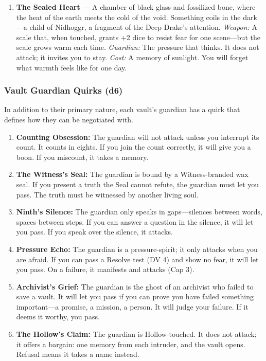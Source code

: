 \begin{enumerate}
\item \textbf{The Sealed Heart} --- A chamber of black glass and fossilized bone, where the heat of the earth meets the cold of the void. Something coils in the dark---a child of Nidhoggr, a fragment of the Deep Drake's attention. \emph{Weapon:} A scale that, when touched, grants +2 dice to resist fear for one scene---but the scale grows warm each time. \emph{Guardian:} The pressure that thinks. It does not attack; it invites you to stay. \emph{Cost:} A memory of sunlight. You will forget what warmth feels like for one day.
\end{enumerate}

\subsubsection*{Vault Guardian Quirks (d6)}
In addition to their primary nature, each vault's guardian has a quirk that defines how they can be negotiated with.

\begin{enumerate}
\item \textbf{Counting Obsession:} The guardian will not attack unless you interrupt its count. It counts in eights. If you join the count correctly, it will give you a boon. If you miscount, it takes a memory.
\item \textbf{The Witness's Seal:} The guardian is bound by a Witness-branded wax seal. If you present a truth the Seal cannot refute, the guardian must let you pass. The truth must be witnessed by another living soul.
\item \textbf{Ninth's Silence:} The guardian only speaks in gaps---silences between words, spaces between steps. If you can answer a question in the silence, it will let you pass. If you speak over the silence, it attacks.
\item \textbf{Pressure Echo:} The guardian is a pressure-spirit; it only attacks when you are afraid. If you can pass a Resolve test (DV 4) and show no fear, it will let you pass. On a failure, it manifests and attacks (Cap 3).
\item \textbf{Archivist's Grief:} The guardian is the ghost of an archivist who failed to save a vault. It will let you pass if you can prove you have failed something important---a promise, a mission, a person. It will judge your failure. If it deems it worthy, you pass.
\item \textbf{The Hollow's Claim:} The guardian is Hollow-touched. It does not attack; it offers a bargain: one memory from each intruder, and the vault opens. Refusal means it takes a name instead.
\end{enumerate}

